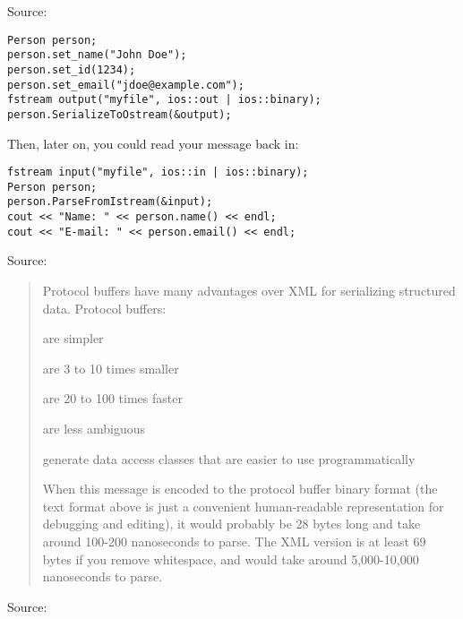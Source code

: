 \documentclass[Screen16to9,17pt]{foils}
\begin{document}
Source:  {\footnotesize\\}


\begin{verbatim}
Person person;
person.set_name("John Doe");
person.set_id(1234);
person.set_email("jdoe@example.com");
fstream output("myfile", ios::out | ios::binary);
person.SerializeToOstream(&output);
\end{verbatim}

Then, later on, you could read your message back in:
\begin{verbatim}
fstream input("myfile", ios::in | ios::binary);
Person person;
person.ParseFromIstream(&input);
cout << "Name: " << person.name() << endl;
cout << "E-mail: " << person.email() << endl;
\end{verbatim}


Source:  {\footnotesize\\}



\begin{quote}
Protocol buffers have many advantages over XML for serializing structured data. Protocol buffers:

\begin{list2}
\item are simpler
\item are 3 to 10 times smaller
\item are 20 to 100 times faster
\item are less ambiguous
\item generate data access classes that are easier to use programmatically
\end{list2}

When this message is encoded to the protocol buffer binary format (the text format above is just a convenient human-readable representation for debugging and editing), it would probably be 28 bytes long and take around 100-200 nanoseconds to parse. The XML version is at least 69 bytes if you remove whitespace, and would take around 5,000-10,000 nanoseconds to parse.
\end{quote}
Source:  {\footnotesize\\}

\end{document}
